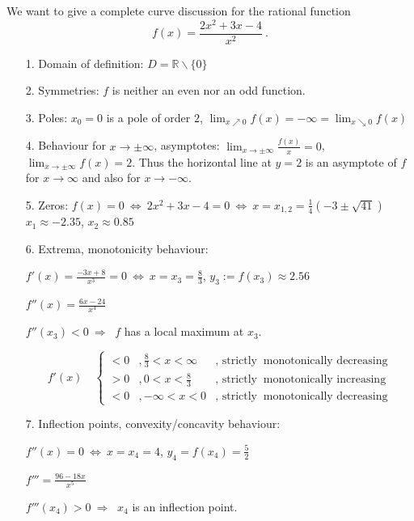\begin{example}
  We want to give a complete curve discussion for the rational function 
  $$f(x)=\frac{2x^2+3x-4}{x^2} \ .$$
\begin{enumerate}
    \item[1.] Domain of definition: $D=\mathbb{R}\backslash\{0\}$
 \item[2.] Symmetries: $f$ is neither an even nor an odd function.
 \item[3.] Poles: $x_0=0$ is a pole of order $2$, $\lim_{x\nearrow 0}f(x)=-\infty=\lim_{x\searrow 0}f(x)$
 \item[4.] Behaviour for $x\longrightarrow \pm\infty$, asymptotes:      
	     $\lim_{x\rightarrow\pm\infty}\frac{f(x)}{x} = 0$,
	     $\lim_{x\rightarrow\pm\infty} f(x) =2$.
            Thus the horizontal line at $y=2$ is an asymptote of $f$ for $x\longrightarrow \infty$  and also for $x\longrightarrow -\infty$.
 \item[5.] Zeros: $f(x)=0 \ \Leftrightarrow \ 2x^2+3x-4=0 \ \Leftrightarrow \  x=x_{1,2}=\frac{1}{4}(-3\pm\sqrt{41})$\\
            $x_1\approx-2.35$,  $x_2\approx 0.85$	    
 \item[6.] Extrema, monotonicity behaviour:
	    
            $f'(x)=\frac{-3x+8}{x^3}=0 \ \Leftrightarrow \ x=x_3= \frac{8}{3}$, $y_3:=f(x_3)\approx 2.56$

	    $f''(x)=\frac{6x-24}{x^4}$  
              
            $f''(x_3)<0 \ \Rightarrow \ $ $f$ has a local maximum at $x_3$.    

        \[ f'(x) \quad \left\{
 	\begin{array}{lll}
	  <0 &, \frac{8}{3} <x <\infty & \text{, strictly }\ \text{monotonically decreasing} \\
	  >0 &, 0<x<\frac{8}{3}        & \text{, strictly }\ \text{monotonically increasing} \\
	  <0 &, -\infty<x<0            & \text{, strictly }\ \text{monotonically decreasing} 
 	\end{array}
         \right.
         \]

 \item[7.] Inflection points, convexity/concavity behaviour:
      
      $f''(x)=0 \ \Leftrightarrow \  x=x_4=4$, $y_4=f(x_4)=\frac{5}{2}$

      $f'''=\frac{96-18x}{x^5}$ 

      $f'''(x_4)>0 \ \Rightarrow \ $ $x_4$ is an inflection point.



\end{enumerate}
\end{example}
